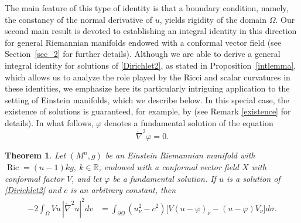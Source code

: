 \documentclass[reqno,11pt]{amsart}
\numberwithin{equation}{section}  %
\newcommand{\Ric}{\operatorname{Ric}}
\newtheorem{theoremletter}{Theorem}
\begin{document}
The main feature of this type of identity is that a boundary condition, namely, the constancy of the normal derivative of $u$, yields rigidity of the domain $\Omega$. Our second main result is devoted to establishing an integral identity in this direction for general Riemannian manifolds endowed with a conformal vector field (see Section~\ref{sec_2} for further details). Although we are able to derive a general integral identity for solutions of \eqref{Dirichlet2}, as stated in Proposition~\ref{intlemma}, which allows us to analyze the role played by the Ricci and scalar curvatures in these identities, we emphasize here its particularly intriguing application to the setting of Einstein manifolds, which we describe below. In this special case, the existence of solutions is guaranteed, for example, by \cite[Theorem 2.3]{foga} (see Remark \ref{existence} for details). In what follows, \(\varphi\) denotes a fundamental solution of the equation
\[
\mathring{\nabla}^{2}\varphi=0.
\]

\begin{theoremletter}\label{MainTh_2}
Let $(M^n,g)$ be an Einstein Riemannian manifold with $\Ric=(n-1)kg, \ k\in\mathbb{R}$, endowed with a conformal vector field $X$ with conformal factor $V$, and let $\varphi$ be a fundamental solution. If $u$ is a solution of \eqref{Dirichlet2} and $c$ is an arbitrary constant, then
\begin{align*}
-2\int_{\Omega}Vu\,|\mathring{\nabla}^{2}u|^{2}dv
&=
\int_{\partial\Omega}(u_{\nu}^{2}-c^{2})
\bigl[V(u-\varphi)_{\nu}-(u-\varphi)V_{\nu}\bigr]d\sigma. \\
\end{align*}
    
\end{theoremletter}
\end{document}
